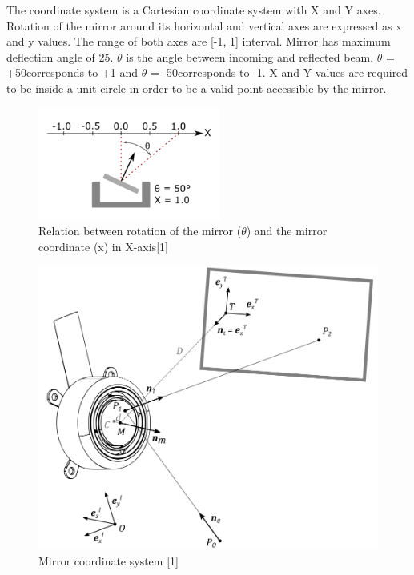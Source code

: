 The coordinate system is a Cartesian coordinate system with X and Y axes.
Rotation of the mirror around its horizontal and vertical axes are expressed
as x and y values. The range of both axes are [-1, 1] interval. Mirror
has maximum deflection angle of 25\degree .  $\theta$ is the angle between
incoming and reflected beam.  $\theta$ = +50\degree  corresponds to +1
and $\theta$ = -50\degree  corresponds to -1.  X and Y values are required
to be inside a unit circle in order to be a valid point accessible by the mirror.



\begin{figure}[!htb]\centering
    \includegraphics*[width = 6cm]{bilder/project/mirror_rotation.png}
    \caption{Relation between rotation of the mirror ($\theta$) and the
    mirror coordinate (x) in X-axis[1]}
    \label{fig:mirror_rotation}
\end{figure}



\begin{figure}[!htb]\centering
    \includegraphics*[width = 12cm]{bilder/project/coordinate_systems.png}
    \caption{Mirror coordinate system [1]}
    \label{fig:coordinate_systems}
\end{figure}


